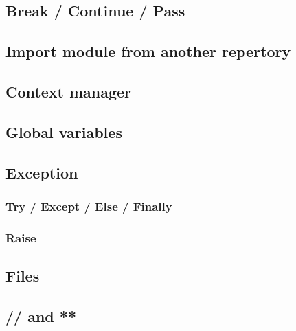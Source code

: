 \documentclass[a4paper, 12pt]{article}
\begin{document}
\subsection{Break / Continue / Pass}
\subsection{Import module from another repertory}
\subsection{Context manager}
\subsection{Global variables}
\subsection{Exception}
\subsubsection{Try / Except / Else / Finally}
\subsubsection{Raise}
\subsection{Files}
\subsection{// and **}
\end{document}

